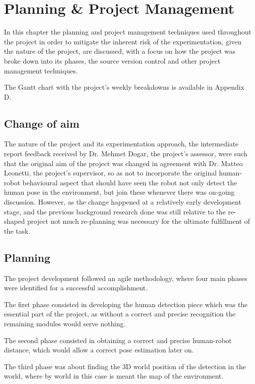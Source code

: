 \chapter{Planning \& Project Management}
\label{chapter7}

In this chapter the planning and project management techniques used throughout the project in order to mitigate the inherent risk of the experimentation, given the nature of the project, are discussed, with a focus on how the project was broke down into its phases, the source version control and other project management techniques.

The Gantt chart with the project's weekly breakdowns is available in Appendix D.

\section{Change of aim}

The nature of the project and its experimentation approach, the intermediate report feedback received by Dr. Mehmet Dogar, the project's assessor, were such that the original aim of the project was changed in agreement with Dr. Matteo Leonetti, the project's supervisor, so as not to incorporate the original human-robot behavioural aspect that should have seen the robot not only detect the human pose in the environment, but join these whenever there was on-going discussion. However, as the change happened at a relatively early development stage, and the previous background research done was still relative to the re-shaped project not much re-planning was necessary for the ultimate fulfillment of the task.

\section{Planning}

The project development followed an agile methodology, where four main phases were identified for a successful accomplishment.

The first phase consisted in developing the human detection piece which was the essential part of the project, as without a correct and precise recognition the remaining modules would serve nothing.

The second phase consisted in obtaining a correct and precise human-robot distance, which would allow a correct pose estimation later on.

The third phase was about finding the 3D world position of the detection in the world, where by world in this case is meant the map of the environment.

